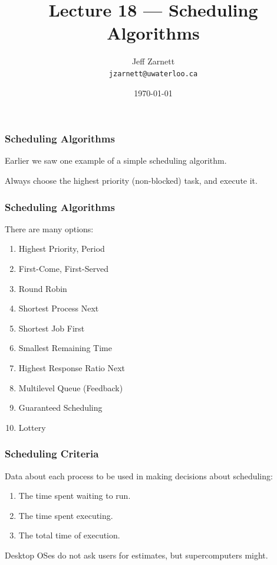 

\title{Lecture 18 --- Scheduling Algorithms}

\author{Jeff Zarnett \\ \small \texttt{jzarnett@uwaterloo.ca}}
\date{\today}




\begin{frame}
  \titlepage

 \end{frame}



\begin{frame}
\frametitle{Scheduling Algorithms}

Earlier we saw one example of a simple scheduling algorithm. 

Always choose the highest priority (non-blocked) task, and execute it. 

 \end{frame}



\begin{frame}
\frametitle{Scheduling Algorithms}


There are many options:
\begin{enumerate}
	\item Highest Priority, Period
	\item First-Come, First-Served
	\item Round Robin
	\item Shortest Process Next
	\item Shortest Job First
	\item Smallest Remaining Time
	\item Highest Response Ratio Next
	\item Multilevel Queue (Feedback)
	\item Guaranteed Scheduling
	\item Lottery
\end{enumerate}


\end{frame}

\begin{frame}
\frametitle{Scheduling Criteria}

Data about each process to be used in making decisions about scheduling:

\begin{enumerate}
	\item The time spent waiting to run.
	\item The time spent executing.
	\item The total time of execution.
\end{enumerate}

Desktop OSes do not ask users for estimates, but supercomputers might.

\end{frame}

